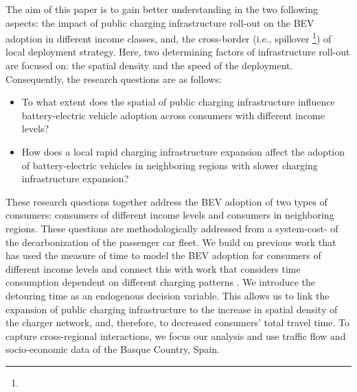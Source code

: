 \documentclass[preprint,review,11pt, authoryear]{elsarticle}
\begin{document}
    The aim of this paper is to gain  better understanding in the two following aspects: the impact of public charging infrastructure roll-out on the BEV adoption in different income classes, and, the cross-border (i.e., spill\deleted{-}over \footnote{}) of  local deployment strategy. Here, two determining factors of infrastructure roll-out are focused on: the spatial density and the speed of the deployment. 
    Consequently, the research questions are as follows: 
    
    \begin{mdframed}
        \begin{itemize}
            \item[\textbf{RQ1:}] To what extent does the spatial  of public charging infrastructure influence battery-electric vehicle adoption across consumers with different income levels?

            \item[\textbf{RQ2:}] How does a local rapid charging infrastructure expansion affect the adoption of battery-electric vehicles in neighboring regions with slower charging infrastructure expansion? 
        \end{itemize}
    \end{mdframed}
    
    These research questions together address the BEV adoption of two types of consumers: consumers of different income levels and consumers in neighboring regions. These questions are methodologically addressed from a system-cost- of the decarbonization of the passenger car fleet. We build on previous work that has used the measure of time to model the BEV adoption for consumers of different income levels \citep{TATTINI2018265} and connect this with work that considers time consumption dependent on different charging patterns \citep{luh2022behavior}. We introduce the detouring time as an endogenous decision variable. This allows us to link the expansion of public charging infrastructure to the increase in spatial density of the charger network, and, therefore, to decreased consumers' total travel time. To capture cross-regional interactions, we focus our analysis   and use traffic flow and socio-economic data of the Basque Country, Spain. 
    
\end{document}
